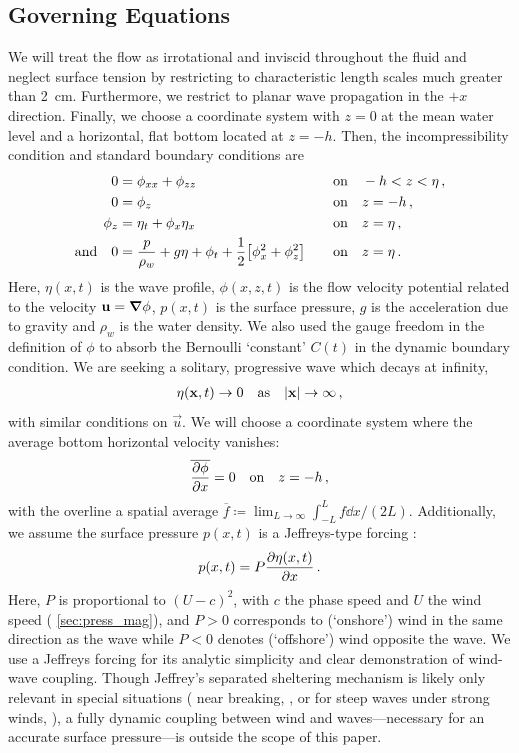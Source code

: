\documentclass{jfm}
\begin{document}
\subsection{Governing Equations}
We will treat the flow as irrotational and inviscid throughout the
fluid and neglect surface tension by restricting to characteristic
length scales much greater than \SI{2}{\centi\meter}.
Furthermore, we restrict to planar wave propagation in the $+x$
direction.
Finally, we choose a coordinate system with $z=0$ at the mean water
level and a horizontal, flat bottom located at $z=-h$.
Then, the incompressibility condition and standard boundary conditions
are
\begin{alignat}{2}
  0 &= \phi_{xx} + \phi_{zz} &&\qq{on}
  -h < z < \eta \,, \label{eq:laplace}\\
  0 &= \phi_{z} &&\qq{on} z=-h \,, \label{eq:bottom_bc}\\
  \phi_{z} &= \eta_{t} + \phi_{x} \eta_{x} &&\qq{on} z = \eta \,,
  \label{eq:kinematic_bc}\\
  \qq*{and} 0 &= \frac{p}{\rho_w} + g\eta + \phi_{t} +
  \frac{1}{2} \bqty{\phi_{x}^2 + \phi_{z}^2} &&\qq{on} z=
  \eta \,. \label{eq:dynamic_bc}
\end{alignat}
Here, $\eta(x,t)$ is the wave profile, $\phi(x,z,t)$ is the flow
velocity potential related to the velocity $\mathbf{\bm{u}} = \grad{\phi}$,
$p(x,t)$ is the surface pressure, $g$ is the acceleration due to
gravity and $\rho_w$ is the water density.
We also used the gauge freedom in the definition of $\phi$ to absorb the
Bernoulli `constant' $C(t)$ in the dynamic boundary condition.
We are seeking a solitary, progressive wave which decays at infinity,
\begin{gather}
  \eta(\vec{x},t) \to 0 \qq{as} \abs{\vec{x}} \to \infty \,,
\end{gather}
with similar conditions on $\vec{u}$.
We will choose a coordinate system where the average bottom horizontal
velocity vanishes:
\begin{equation}
  \overline{ \pdv{\phi}{x} } = 0 \qq{on} z=-h \,,
  \label{eq:bot_bc_horz}
\end{equation}
with the overline a spatial average $\overline{f} \coloneqq
\lim_{L\to\infty} \int_{-L}^{L} f \dd{x} / (2L)$.
Additionally, we assume the surface pressure $p(x,t)$ is a Jeffreys-type
forcing \citep{jeffreys1925formation}:
\begin{equation}
  p(x,t) = P \pdv{\eta(x,t)}{x} \,.
\end{equation}
Here, $P$ is proportional to $(U-c)^2$, with $c$ the phase speed and $U$
the wind speed (\cf{} \cref{sec:press_mag}), and $P>0$ corresponds to
(`onshore') wind in the same direction as the wave while $P<0$ denotes
(`offshore') wind opposite the wave.
We use a Jeffreys forcing for its analytic simplicity and clear
demonstration of wind-wave coupling.
Though Jeffrey's separated sheltering mechanism is likely only relevant
in special situations (\eg{} near breaking,
\citealp{banner1976separation}, or for steep waves under strong winds,
\citealp{tian2013evolution,touboul2006interaction}),
a fully dynamic coupling between wind and waves---necessary for an
accurate surface pressure---is outside the scope of this paper.
\end{document}
